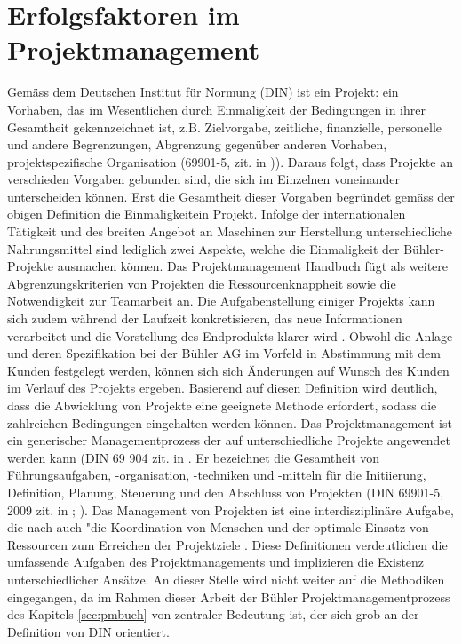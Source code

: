 \section{Erfolgsfaktoren im Projektmanagement} \label{sec:erfprj}	
Gemäss dem Deutschen Institut für Normung (DIN)  ist ein Projekt: \glqq ein Vorhaben, das im Wesentlichen durch Einmaligkeit der Bedingungen in ihrer Gesamtheit gekennzeichnet ist, z.B. Zielvorgabe, zeitliche, finanzielle, personelle und andere Begrenzungen, Abgrenzung gegenüber anderen Vorhaben, projektspezifische Organisation \grqq{ } (69901-5, zit. in \citealp{alamg16})). Daraus folgt, dass Projekte an verschieden Vorgaben gebunden sind, die sich im Einzelnen voneinander unterscheiden können. Erst die Gesamtheit dieser Vorgaben begründet gemäss der obigen Definition die Einmaligkeitein Projekt. Infolge der internationalen Tätigkeit und des breiten Angebot an Maschinen zur Herstellung unterschiedliche Nahrungsmittel sind lediglich zwei Aspekte, welche die Einmaligkeit der Bühler-Projekte ausmachen können. Das Projektmanagement Handbuch \citeyear{pmhod} fügt als weitere Abgrenzungskriterien von Projekten die Ressourcenknappheit sowie die Notwendigkeit zur Teamarbeit an. Die Aufgabenstellung einiger Projekts kann sich zudem während der Laufzeit konkretisieren, das neue Informationen verarbeitet und die Vorstellung des Endprodukts klarer wird \citep[S.~1]{meyreh16}. Obwohl die Anlage und deren Spezifikation bei der Bühler AG im Vorfeld in Abstimmung mit dem Kunden festgelegt werden, können sich  sich Änderungen auf Wunsch des Kunden im Verlauf des Projekts ergeben. Basierend auf diesen Definition wird deutlich, dass die Abwicklung von Projekte eine geeignete Methode erfordert, sodass die zahlreichen Bedingungen eingehalten werden können. Das Projektmanagement ist ein \glqq generischer Managementprozess \grqq{ } der auf unterschiedliche Projekte angewendet werden kann (DIN 69 904 zit. in \citealp{pmhod}. Er bezeichnet die \glqq Gesamtheit von Führungsaufgaben, -organisation, -techniken und -mitteln für die Initiierung, Definition, Planung, Steuerung und den Abschluss von Projekten\grqq{ } (DIN 69901-5, 2009 zit. in \citealp[S.~3]{meyreh16}; \citealp{pmhod}). Das Management von Projekten ist eine interdisziplinäre Aufgabe, die nach \citealp[S.~2]{alamg16} auch "die Koordination von Menschen und der optimale Einsatz von Ressourcen zum Erreichen der Projektziele \grqq { }. Diese Definitionen verdeutlichen die umfassende Aufgaben des Projektmanagements und implizieren die Existenz unterschiedlicher Ansätze. An dieser Stelle wird nicht weiter auf die Methodiken eingegangen, da im Rahmen dieser Arbeit der Bühler Projektmanagementprozess des Kapitels \ref{sec:pmbueh} von zentraler Bedeutung ist, der sich grob an der Definition von DIN orientiert.
